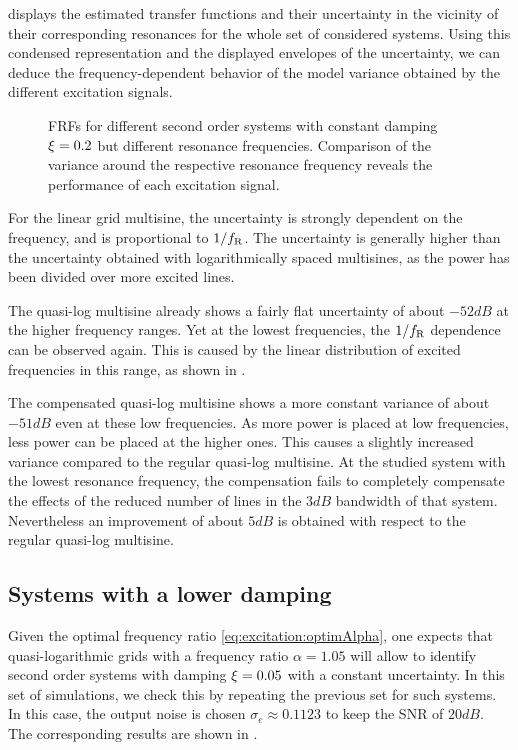    displays the estimated transfer functions and their uncertainty in the vicinity of their corresponding resonances for the whole set of considered systems.
  Using this condensed representation and the displayed envelopes of the uncertainty, we can deduce the frequency-dependent behavior of the model variance obtained by the different excitation signals.

  \begin{figure}%
    \centering
      \setlength{}
      \setlength\figureheight{0.68\figurewidth}
    
    \caption[Simulated  of systems with damping $0.2$ for different excitation signals.]{%
       \Glspl{FRF} for different second order systems with constant damping $\xi_{}=0.2$ but different resonance frequencies. 
       Comparison of the variance around the respective resonance frequency reveals the performance of each excitation signal.}%
    \label{fig:excitation:damping02}
  \end{figure}

  For the linear grid multisine, the uncertainty is strongly dependent on the frequency, and is proportional to $1/f_{\mathrm{R}}$.
  The uncertainty is generally higher than the uncertainty obtained with logarithmically spaced multisines, as the power has been divided over more excited lines.

  The quasi-log multisine already shows a fairly flat uncertainty of about $-52 \unit{dB}$ at the higher frequency ranges.
  Yet at the lowest frequencies, the $1/f_{\mathrm{R}}$ dependence can be observed again.
  This is caused by the linear distribution of excited frequencies in this range, as shown in .

  The compensated quasi-log multisine shows a more constant variance of about $-51 \unit{dB}$ even at these low frequencies.
  As more power is placed at low frequencies, less power can be placed at the higher ones.
  This causes a slightly increased variance compared to the regular quasi-log multisine.
  At the studied system with the lowest resonance frequency, the compensation fails to completely compensate the effects of the reduced number of lines in the $3\unit{dB}$ bandwidth of that system.
  Nevertheless an improvement of about $5\unit{dB}$ is obtained with respect to the regular quasi-log multisine.

  \subsection{Systems with a lower damping}
  Given the optimal frequency ratio \eqref{eq:excitation:optimAlpha}, one expects that quasi-logarithmic grids with a frequency ratio $\alpha = 1.05$ will allow to identify second order systems with damping $\xi_{} = 0.05$ with a constant uncertainty.
  In this set of simulations, we check this by repeating the previous set for such systems.
  In this case, the output noise is chosen $\sigma_e \approx 0.1123$ to keep the \gls{SNR} of $20\unit{dB}$.
  The corresponding results are shown in .
 
